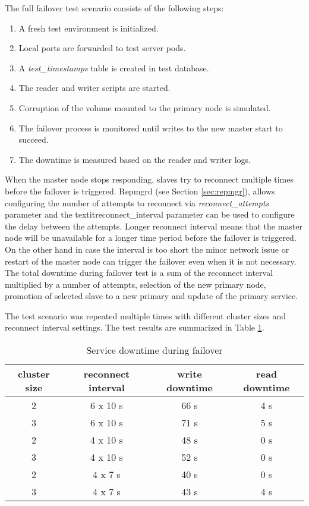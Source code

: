 \documentclass[
  digital, %
  twoside, %
  table,   %
  nolof,   %
  nolot,   %
]{fithesis3}
\begin{document}
The full failover test scenario consists of the following steps:
\begin{enumerate}
  \item  A fresh test environment is initialized. 
  \item Local ports are forwarded to test server pods.
  \item A \textit{test\_timestamps} table is created in test database.
  \item The reader and writer scripts are started.
  \item Corruption of the volume mounted to the primary node is simulated.
  \item The failover process is monitored until writes to the new master start to succeed.
  \item The downtime is measured based on the reader and writer logs.
\end{enumerate}

When the master node stops responding, slaves try to reconnect multiple times before the failover is triggered. Repmgrd (see Section \ref{sec:repmgr}), allows configuring the number of attempts to reconnect via \textit{reconnect\_attempts} parameter and the textit{reconnect\_interval} parameter can be used to configure the delay between the attempts. Longer reconnect interval means that the master node will be unavailable for a longer time period before the failover is triggered. On the other hand in case the interval is too short the minor network issue or restart of the master node can trigger the failover even when it is not necessary. The total downtime during failover test is a sum of the reconnect interval multiplied by a number of attempts, selection of the new primary node, promotion of selected slave to a new primary and update of the primary service.

The test scenario was repeated multiple times with different cluster sizes and reconnect interval settings. The test results are summarized in Table \ref{table:failover_testing}.

\begin{table}[ht!]
\centering
\begin{tabular}{|c c c c|}
 \hline
 cluster size & reconnect interval & write downtime & read downtime \\ [0.5ex]
 \hline
 2 & 6 x 10 s & 66 s & 4 s \\
 3 & 6 x 10 s & 71 s & 5 s \\
 2 & 4 x 10 s & 48 s & 0 s \\
 3 & 4 x 10 s & 52 s & 0 s \\
 2 & 4 x 7 s  & 40 s & 0 s  \\
 3 & 4 x 7 s  & 43 s & 4 s  \\ [1ex]
 \hline
\end{tabular}
\caption{Service downtime during failover}
\label{table:failover_testing}
\end{table}
\end{document}
